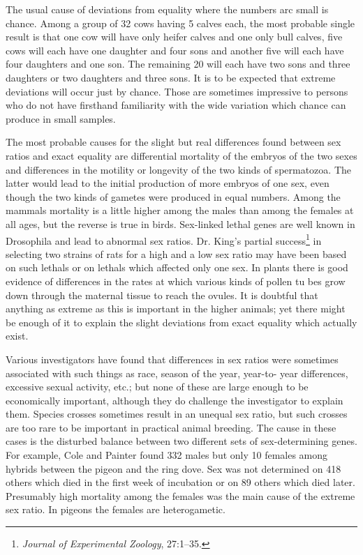 The usual cause of deviations from equality where the numbers arc
small is chance. Among a group of 32 cows having 5 calves each, the
most probable single result is that one cow will have only heifer calves
and one only bull calves, five cows will each have one daughter and four
sons and another five will each have four daughters and one son. The
remaining 20 will each have two sons and three daughters or two
daughters and three sons. It is to be expected that extreme deviations
will occur just by chance. Those are sometimes impressive to persons
who do not have firsthand familiarity with the wide variation which
chance can produce in small samples.

The most probable causes for the slight but real differences found
between sex ratios and exact equality are differential mortality of the
embryos of the two sexes and differences in the motility or longevity of
the two kinds of spermatozoa. The latter would lead to the initial production
of more embryos of one sex, even though the two kinds of gametes
were produced in equal numbers. Among the mammals mortality is
a little higher among the males than among the females at all ages, but
the reverse is true in birds. Sex-linked lethal genes are well known in
Drosophila and lead to abnormal sex ratios. Dr. King's partial
success\footnote{\textit{Journal of Experimental Zoology}, 27:1--35.}
in selecting two strains of rats for a high and a low sex ratio may have
been based on such lethals or on lethals which affected only one sex. In
plants there is good evidence of differences in the rates at which various
kinds of pollen tu bes grow down through the maternal tissue to reach
the ovules. It is doubtful that anything as extreme as this is important
in the higher animals; yet there might be enough of it to explain the
slight deviations from exact equality which actually exist.

Various investigators have found that differences in sex ratios were
sometimes associated with such things as race, season of the year, year-to-
year differences, excessive sexual activity, etc.; but none of these are
large enough to be economically important, although they do challenge
the investigator to explain them. Species crosses sometimes result in an
unequal sex ratio, but such crosses are too rare to be important in
practical animal breeding. The cause in these cases is the disturbed balance
between two different sets of sex-determining genes. For example, Cole
and Painter found 332 males but only 10 females among hybrids
between the pigeon and the ring dove. Sex was not determined on 418
others which died in the first week of incubation or on 89 others which
died later. Presumably high mortality among the females was the main
cause of the extreme sex ratio. In pigeons the females are heterogametic.

